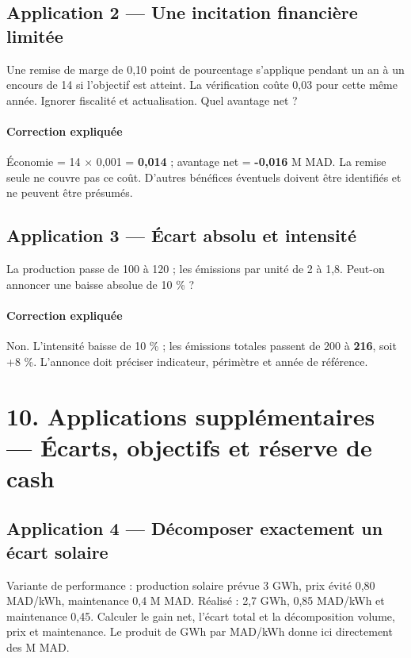 \documentclass[12pt,a4paper]{article}
\begin{document}
\subsection*{Application 2 --- Une incitation financière limitée}
Une remise de marge de 0,10 point de pourcentage s’applique pendant un an à un encours de 14 si l’objectif est atteint. La vérification coûte 0,03 pour cette même année. Ignorer fiscalité et actualisation. Quel avantage net ?


\paragraph{Correction expliquée}
Économie = 14 $\times$ 0,001 = \textbf{0,014} ; avantage net = \textbf{-0,016} M MAD. La remise seule ne couvre pas ce coût. D’autres bénéfices éventuels doivent être identifiés et ne peuvent être présumés.



\subsection*{Application 3 --- Écart absolu et intensité}
La production passe de 100 à 120 ; les émissions par unité de 2 à 1,8. Peut-on annoncer une baisse absolue de 10 \% ?


\paragraph{Correction expliquée}
Non. L’intensité baisse de 10 \% ; les émissions totales passent de 200 à \textbf{216}, soit +8 \%. L’annonce doit préciser indicateur, périmètre et année de référence.

\section*{10. Applications supplémentaires --- Écarts, objectifs et réserve de cash}

\subsection*{Application 4 --- Décomposer exactement un écart solaire}
Variante de performance : production solaire prévue 3 GWh, prix évité 0,80 MAD/kWh, maintenance 0,4 M MAD. Réalisé : 2,7 GWh, 0,85 MAD/kWh et maintenance 0,45. Calculer le gain net, l’écart total et la décomposition volume, prix et maintenance. Le produit de GWh par MAD/kWh donne ici directement des M MAD.
\end{document}
